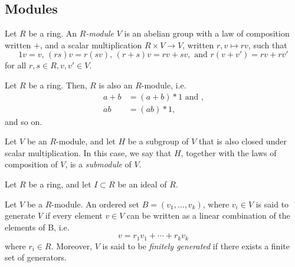 \subsection{Modules}

\label{sec:modules}

\begin{definition}
  Let $R$ be a ring. An \emph{$R$-module} $V$ is an abelian group with a law of composition written $+$, and a scalar multiplication $R \times V \to V$, written $r, v \mapsto rv$, such that
  \begin{equation}
  \label{eq:module-definition}
    1v = v \text{, } (rs)v = r(sv) \text{, } (r + s)v = rv + sv, \text{ and } r(v + v') = rv + rv'
  \end{equation}
  for all $r, s \in R, v, v' \in V$.
\end{definition}

\begin{example}
  Let $R$ be a ring. Then, $R$ is also an $R$-module, i.e.
  \begin{align*}
    a + b &= (a + b) * 1 \text{ and ,} \\
    ab &= (ab) * 1 \text{, }
  \end{align*}
  and so on.
\end{example}

\begin{definition}
  Let $V$ be an $R$-module, and let $H$ be a subgroup of $V$ that is also closed under scalar multiplication. In this case, we say that $H$, together with the laws of composition of $V$, is a \emph{submodule} of $V$.
\end{definition}


\begin{example}
  Let $R$ be a ring, and let $I \subset R$ be an ideal of $R$.

\end{example}

\begin{definition}
  Let $V$ be a $R$-module. An ordered set $B = (v_1, \ldots, v_k)$, where $v_i \in V$ is said to generate $V$ if every element $v \in V$ can be written as a linear combination of the elements of B, i.e.
  \begin{equation*}
    v = r_1v_1 + \cdots + r_kv_k
  \end{equation*}
  where $r_i \in R$. Moreover, $V$ is said to be \emph{finitely generated} if there exists a finite set of generators.
\end{definition}

